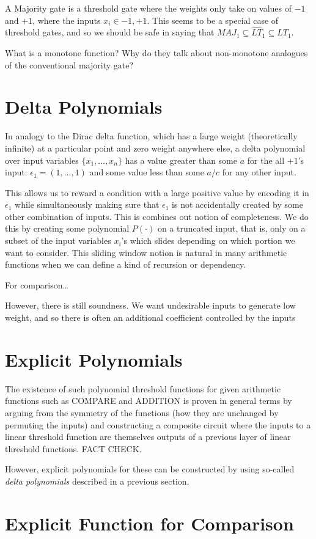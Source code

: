 \documentclass{article}
\begin{document}
A Majority gate is a threshold gate where the weights only take on values of
$-1$ and $+1$, where the inputs $x_i \in {-1,+1}$. This seems to be a 
special case of threshold gates, and so we should be safe in saying that
$MAJ_1 \subseteq \hat{LT}_1 \subseteq LT_1$.

What is a monotone function? Why do they talk about non-monotone analogues 
of the conventional majority gate?

\section{Delta Polynomials}

In analogy to the Dirac delta function, which has a large weight
(theoretically infinite) at a particular point and zero weight anywhere 
else, a delta polynomial over input variables $\{x_1, \ldots, x_n\}$ has
a value greater than some $a$ for the all $+1$'s input:
$\epsilon_1 = (1,\ldots,1)$ and
some value less than some $a/c$ for any other input.

This allows us to reward a condition with a large positive value by 
encoding it in $\epsilon_1$ while simultaneously making sure that
$\epsilon_1$ is not accidentally created by some other combination of 
inputs. This is combines out notion of completeness. We do this by
creating some polynomial $P(\cdot)$ on a truncated input, that is, only
on a subset of the input variables $x_i$'s which slides depending on
which portion we want to consider. This sliding window notion is natural
in many arithmetic functions when we can define a kind of recursion or
dependency.

For comparison\ldots

However, there is still soundness. We want undesirable inputs to generate
low weight, and so there is often an additional coefficient controlled
by the inputs

\section{Explicit Polynomials}

The existence of such polynomial threshold functions for given arithmetic
functions such as COMPARE and ADDITION is proven in general terms by
arguing from the symmetry of the functions (how they are unchanged by
permuting the inputs) and constructing a composite circuit where
the inputs to a linear threshold function are themselves outputs of
a previous layer of linear threshold functions. FACT CHECK.

However, explicit polynomials for these can be constructed by using
so-called \emph{delta polynomials} described in a previous section.

\section{Explicit Function for Comparison}
\end{document}
